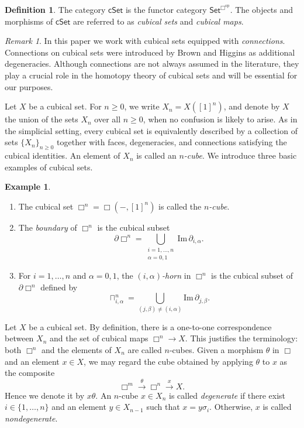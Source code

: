 \documentclass[oneside, 12pt]{amsart}
\numberwithin{equation}{section}
\theoremstyle{plain}
\theoremstyle{definition}
\newtheorem{definition}[theorem]{Definition}
\newtheorem{example}[theorem]{Example}
\theoremstyle{remark}
\newtheorem{remark}[theorem]{Remark}
\newcommand{\cSet}{\mathsf{cSet}}
\begin{document}
	
	
	\begin{definition}
		The category $\cSet$ is the functor category $\mathsf{Set}^{\Box^\mathrm{op}}$. The objects and morphisms of $\cSet$ are referred to as \emph{cubical sets} and \emph{cubical maps}.
	\end{definition}
	
	
	
	\begin{remark}
		In this paper we work with cubical sets equipped with \emph{connections}. Connections on cubical sets were introduced by Brown and Higgins \cite{BH} as additional degeneracies. Although connections are not always assumed in the literature, they play a crucial role in the homotopy theory of cubical sets and will be essential for our purposes.
	\end{remark}
	
	
	
	
	Let $X$ be a cubical set. For $n\ge 0$, we write $X_n=X([1]^n)$, and denote by $X$ the union of the sets $X_n$ over all $n\ge 0$, when no confusion is likely to arise. As in the simplicial setting, every cubical set is equivalently described by a collection of sets $\{X_n\}_{n\ge 0}$ together with faces, degeneracies, and connections satisfying the cubical identities. An element of $X_n$ is called an \emph{$n$-cube}. We introduce three basic examples of cubical sets.
	
	
	
	\begin{example}
		\begin{enumerate}
			\item The cubical set $\Box^n=\Box(-,[1]^n)$ is called the \emph{$n$-cube}.
			
			\item The \emph{boundary} of $\Box^n$ is the cubical subset
			\[
			\partial\Box^n=\bigcup_{\substack{i=1,\ldots,n\\\alpha=0,1}}\mathrm{Im}\,\partial_{i,\alpha}.
			\]
			
			\item For $i=1,\ldots,n$ and $\alpha=0,1$, the \emph{$(i,\alpha)$-horn} in $\Box^n$ is the cubical subset of $\partial\Box^n$ defined by
			\[
			\sqcap^n_{i,\alpha}=\bigcup_{(j,\beta)\ne(i,\alpha)}\mathrm{Im}\,\partial_{j,\beta}.
			\]
		\end{enumerate}
	\end{example}
	
	
	
	Let $X$ be a cubical set. By definition, there is a one-to-one correspondence between $X_n$ and the set of cubical maps $\Box^n\to X$. This justifies the terminology: both $\Box^n$ and the elements of $X_n$ are called $n$-cubes. Given a morphism $\theta$ in $\Box$ and an element $x\in X$, we may regard the cube obtained by applying $\theta$ to $x$ as the composite
	\[
	\Box^m\xrightarrow{\theta}\Box^n\xrightarrow{x}X.
	\]
	Hence we denote it by $x\theta$. An $n$-cube $x\in X_n$ is called \emph{degenerate} if there exist $i\in\{1,\ldots,n\}$ and an element $y\in X_{n-1}$ such that $x=y\sigma_i$. Otherwise, $x$ is called \emph{nondegenerate}.
	
\end{document}
